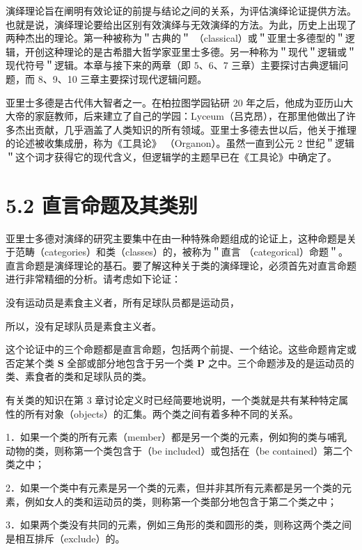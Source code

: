 演绎理论旨在阐明有效论证的前提与结论之间的关系，为评估演绎论证提供方法。也就是说，演绎理论要给出区别有效演绎与无效演绎的方法。为此，历史上出现了两种杰出的理论。第一种被称为＂古典的＂ （classical）或＂亚里士多德型的＂逻辑，开创这种理论的是古希腊大哲学家亚里士多德。另一种称为＂现代＂逻辑或＂现代符号＂逻辑。本章与接下来的两章（即 $5 、 6 、 7$ 三章）主要探讨古典逻辑问题，而 8、9、10 三章主要探讨现代逻辑问题。

亚里士多德是古代伟大智者之一。在柏拉图学园钻研 20 年之后，他成为亚历山大大帝的家庭教师，后来建立了自己的学园：Lyceum（吕克昂），在那里他做出了许多杰出贡献，几乎涵盖了人类知识的所有领域。亚里士多德去世以后，他关于推理的论述被收集成册，称为《工具论》 （Organon）。虽然一直到公元 2 世纪＂逻辑＂这个词才获得它的现代含义，但逻辑学的主题早已在《工具论》中确定了。

\section*{5.2 直言命题及其类别}
亚里士多德对演绎的研究主要集中在由一种特殊命题组成的论证上，这种命题是关于范畴（categories）和类（classes）的，被称为＂直言 （categorical）命题＂。直言命题是演绎理论的基石。要了解这种关于类的演绎理论，必须首先对直言命题进行非常精细的分析。请考虑如下论证：

\begin{displayquote}
没有运动员是素食主义者，所有足球队员都是运动员，
\end{displayquote}

\begin{displayquote}
所以，没有足球队员是素食主义者。
\end{displayquote}

这个论证中的三个命题都是直言命题，包括两个前提、一个结论。这些命题肯定或否定某个类 $\boldsymbol{S}$ 全部或部分地包含于另一个类 $\boldsymbol{P}$ 之中。三个命题涉及的是运动员的类、素食者的类和足球队员的类。

有关类的知识在第 3 章讨论定义时已经简要地说明，一个类就是共有某种特定属性的所有对象（objects）的汇集。两个类之间有着多种不同的关系。

1．如果一个类的所有元素（member）都是另一个类的元素，例如狗的类与哺乳动物的类，则称第一个类包含于（be included）或包括在（be contained）第二个类之中；

2．如果一个类中有元素是另一个类的元素，但并非其所有元素都是另一个类的元素，例如女人的类和运动员的类，则称第一个类部分地包含于第二个类之中；

3．如果两个类没有共同的元素，例如三角形的类和圆形的类，则称这两个类之间是相互排斥（exclude）的。

